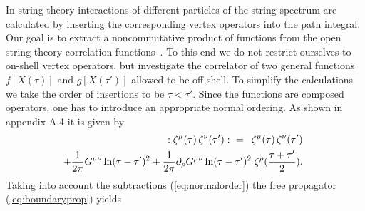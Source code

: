 \documentclass[a4paper,12pt]{article}
\begin{document}
In string theory interactions of different particles of the string spectrum 
are calculated by inserting the corresponding vertex operators
into the path integral. Our goal is to extract a noncommutative
product of functions from the open string theory correlation 
functions~\cite{Cornalba:2001sm}. To this end we do not 
restrict ourselves to on-shell vertex operators, but investigate
the correlator of two general functions $f[X(\tau)]$ and $g[X(\tau')]$ 
allowed to be off-shell. To simplify the calculations we
take the order of insertions to be $\tau < \tau'$.
Since the functions are composed operators,
one has to introduce an appropriate normal ordering. 
As shown in appendix A.4 it is given by
\begin{eqnarray}
  \label{eq:normalorder}
 &&\hspace*{-15pt} : \zeta^\mu (\tau) \, \zeta^\nu (\tau') : \hspace*{6pt}= 
    \hspace*{5pt}\zeta^\mu (\tau) \, \zeta^\nu (\tau')\nonumber 
\\
 &&\hspace*{-15pt}  
    +\frac {1}{2\pi} G^{\mu\nu} \ln(\tau-\tau')^2    
     +\frac {1}{2\pi} 
     \partial_\rho G^{\mu \nu} \ln(\tau-\tau')^2
     \; \zeta^\rho (\frac {\tau+\tau'}{2}) .
\end{eqnarray}
Taking into account the subtractions (\ref{eq:normalorder}) the free
propagator (\ref{eq:boundaryprop}) yields~\cite{Schomerus:1999ug}
\end{document}
